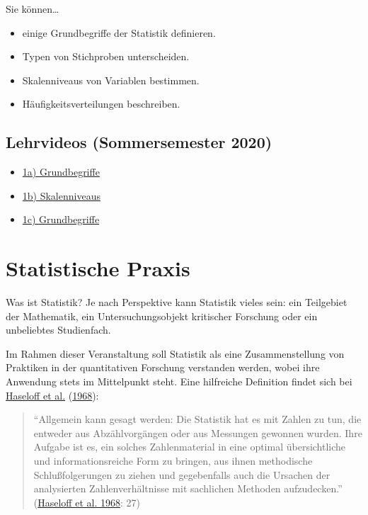 \documentclass[
  11pt,
  ngerman,
  a4paper,
]{report}
\providecommand{\tightlist}{%
  \setlength{\itemsep}{0pt}\setlength{\parskip}{0pt}}
\begin{document}
Sie können\ldots{}

\begin{itemize}
\tightlist
\item
  einige Grundbegriffe der Statistik definieren.
\item
  Typen von Stichproben unterscheiden.
\item
  Skalenniveaus von Variablen bestimmen.
\item
  Häufigkeitsverteilungen beschreiben.
\end{itemize}

\hypertarget{lehrvideos-sommersemester-2020}{%
\subsection*{Lehrvideos (Sommersemester 2020)}\label{lehrvideos-sommersemester-2020}}

\begin{itemize}
\tightlist
\item
  \href{https://video01.uni-frankfurt.de/Mediasite/Play/36dca452df154bd3b7be2e069174e8991d}{1a) Grundbegriffe}
\item
  \href{https://video01.uni-frankfurt.de/Mediasite/Play/5a397035f7a6468fa2cecf802ca8d52a1d}{1b) Skalenniveaus}
\item
  \href{https://video01.uni-frankfurt.de/Mediasite/Play/5fce0458009b4da283b14fdc30e3a0ea1d}{1c) Grundbegriffe}
\end{itemize}

\hypertarget{statistische-praxis}{%
\section{Statistische Praxis}\label{statistische-praxis}}

Was ist Statistik? Je nach Perspektive kann Statistik vieles sein: ein Teilgebiet der Mathematik, ein Untersuchungsobjekt kritischer Forschung oder ein unbeliebtes Studienfach.

Im Rahmen dieser Veranstaltung soll Statistik als eine Zusammenstellung von Praktiken in der quantitativen Forschung verstanden werden, wobei ihre Anwendung stets im Mittelpunkt steht. Eine hilfreiche Definition findet sich bei \protect\hyperlink{ref-haseloff}{Haseloff et al.} (\protect\hyperlink{ref-haseloff}{1968}):

\begin{quote}
\enquote{Allgemein kann gesagt werden: Die Statistik hat es mit Zahlen zu tun, die entweder aus Abzählvorgängen oder aus Messungen gewonnen wurden. Ihre Aufgabe ist es, ein solches Zahlenmaterial in eine optimal übersichtliche und informationsreiche Form zu bringen, aus ihnen methodische Schlußfolgerungen zu ziehen und gegebenfalls auch die Ursachen der analysierten Zahlenverhältnisse mit sachlichen Methoden aufzudecken.} (\protect\hyperlink{ref-haseloff}{Haseloff et al. 1968}: 27)
\end{quote}
\end{document}
